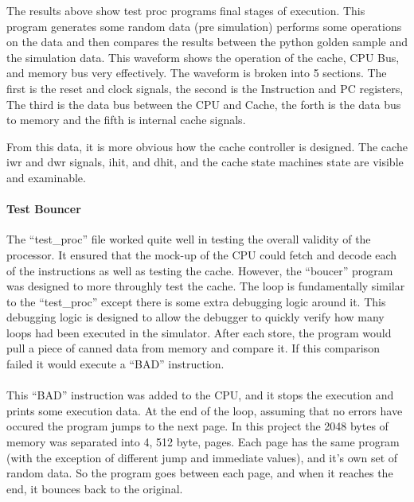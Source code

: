 \documentclass[11pt,letterpaper,]{article}
\begin{document}
The results above show test proc programs final stages of execution.  This program generates some random data (pre simulation) performs some operations on the data and then compares the results between the python golden sample and the simulation data.  This waveform shows the operation of the cache, CPU Bus, and memory bus very effectively.  The waveform is broken into 5 sections.  The first is the reset and clock signals, the second is the Instruction and PC registers, The third is the data bus between the CPU and Cache, the forth is the data bus to memory and the fifth is internal cache signals.

From this data, it is more obvious how the cache controller is designed.  The cache iwr and dwr signals, ihit, and dhit, and the cache state machines state are visible and examinable.

\paragraph{ Test Bouncer }
The ``test\_proc'' file worked quite well in testing the overall validity of the processor.  It ensured that the mock-up of the CPU could fetch and decode each of the instructions as well as testing the cache.  However, the ``boucer'' program was designed to more throughly test the cache.  The loop is fundamentally similar to the ``test\_proc'' except there is some extra debugging logic around it.  This debugging logic is designed to allow the debugger to quickly verify how many loops had been executed in the simulator.  After each store, the program would pull a piece of canned data from memory and compare it.  If this comparison failed it would execute a ``BAD'' instruction.

\paragraph{}
This ``BAD'' instruction was added to the CPU, and it stops the execution and prints some execution data.  At the end of the loop, assuming that no errors have occured the program jumps to the next page.  In this project the 2048 bytes of memory was separated into 4, 512 byte, pages.  Each page has the same program (with the exception
of different jump and immediate values), and it's own set of random data.  So the program goes between each page, and when it reaches the end, it bounces back to the original.
\end{document}
